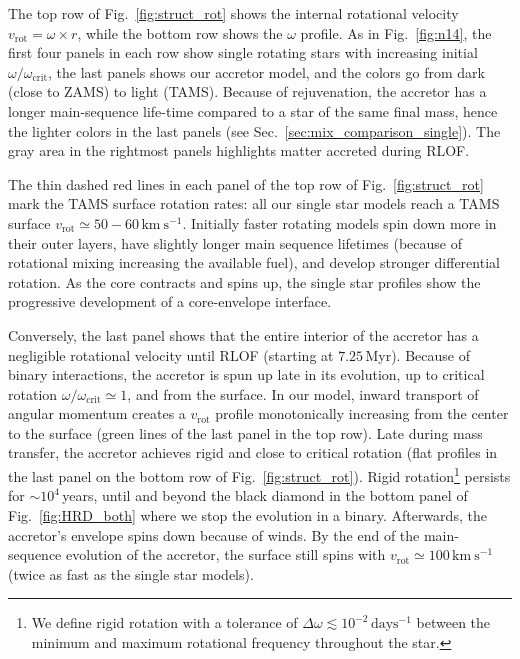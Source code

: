 \documentclass[twocolumn,twocolappendix,trackchanges]{aastex63}
\newcommand{\kms}{{\mathrm{km\ s^{-1}}}}
\DeclareRobustCommand{\Figref}[1]{Fig.~\ref{#1}}
\DeclareRobustCommand{\Secref}[1]{Sec.~\ref{#1}}
\begin{document}
The top row of \Figref{fig:struct_rot} shows the internal rotational
velocity $v_\mathrm{rot}=\omega\times r$, while the bottom row shows
the $\omega$ profile. As in \Figref{fig:n14}, the first four panels in
each row show single rotating stars with increasing initial
$\omega/\omega_\mathrm{crit}$, the last panels shows our accretor
model, and the colors go from dark (close to ZAMS) to light
(TAMS). Because of rejuvenation, the accretor has a longer
main-sequence life-time compared to a star of the same final mass,
hence the lighter colors in the last panels (see
\Secref{sec:mix_comparison_single}). The gray area in the rightmost
panels highlights matter accreted during RLOF.

The thin dashed red lines in each panel of the top row of
\Figref{fig:struct_rot} mark the TAMS surface rotation rates: all our
single star models reach a TAMS surface
$v_\mathrm{rot}\simeq50-60\,\kms$. Initially faster rotating models
spin down more in their outer layers, have slightly longer main
sequence lifetimes (because of rotational mixing increasing the
available fuel), and develop stronger differential rotation. As the
core contracts and spins up, the single star profiles show the
progressive development of a core-envelope interface.

Conversely, the last panel shows that the entire interior of the
accretor has a negligible rotational velocity until RLOF (starting at
$7.25$\,Myr). Because of binary interactions, the accretor is spun up
late in its evolution, up to critical rotation
$\omega/\omega_\mathrm{crit}\simeq1$, and from the surface. In our
model, inward transport of angular momentum creates a $v_\mathrm{rot}$
profile monotonically increasing from the center to the surface (green
lines of the last panel in the top row). Late during mass transfer,
the accretor achieves rigid and close to critical rotation (flat
profiles in the last panel on the bottom row of
\Figref{fig:struct_rot}). Rigid rotation\footnote{We define rigid
  rotation with a tolerance of
$\Delta \omega \lesssim 10^{-2}\,\mathrm{days^{-1}}$ between the minimum and maximum
rotational frequency throughout the star.} persists for
$\sim10^{4}$\,years, until and beyond the black diamond in the bottom
panel of \Figref{fig:HRD_both} where we stop the evolution in a
binary. Afterwards, the accretor's envelope spins down
because of winds. By the end of the main-sequence evolution of the
accretor, the surface still spins with $v_\mathrm{rot}\simeq100\,\kms$
(twice as fast as the single star models).
\end{document}
